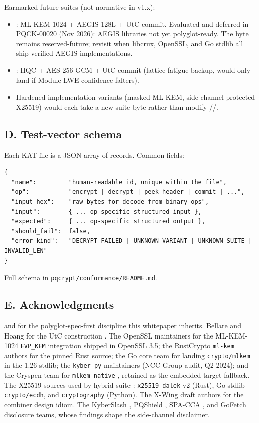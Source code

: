 Earmarked future suites (not normative in v1.x):
\begin{itemize}
\item {}: ML-KEM-1024 + AEGIS-128L + UtC commit. Evaluated and deferred in PQCK-00020 (Nov 2026): AEGIS libraries not yet polyglot-ready. The byte remains reserved-future; revisit when libcrux, OpenSSL, and Go stdlib all ship verified AEGIS implementations.
\item {}: HQC + AES-256-GCM + UtC commit (lattice-fatigue backup, would only land if Module-LWE confidence falters).
\item Hardened-implementation variants (masked ML-KEM, side-channel-protected X25519) would each take a new suite byte rather than modify //.
\end{itemize}

\subsection*{D. Test-vector schema}

Each KAT file is a JSON array of records. Common fields:

\begin{lstlisting}[language=Pseudocode]
{
  "name":         "human-readable id, unique within the file",
  "op":           "encrypt | decrypt | peek_header | commit | ...",
  "input_hex":    "raw bytes for decode-from-binary ops",
  "input":        { ... op-specific structured input },
  "expected":     { ... op-specific structured output },
  "should_fail":  false,
  "error_kind":   "DECRYPT_FAILED | UNKNOWN_VARIANT | UNKNOWN_SUITE | INVALID_LEN"
}
\end{lstlisting}

Full schema in \texttt{pqcrypt/conformance/README.md}.

\subsection*{E. Acknowledgments}

\pqid{} and \pqhash{} for the polyglot-spec-first discipline this whitepaper inherits. Bellare and Hoang for the UtC construction \citep{bellare2022commitment}. The OpenSSL maintainers for the ML-KEM-1024 \texttt{EVP\_KEM} integration shipped in OpenSSL 3.5; the RustCrypto \texttt{ml-kem} authors for the pinned Rust source; the Go core team for landing \texttt{crypto/mlkem} in the 1.26 stdlib; the \texttt{kyber-py} maintainers (NCC Group audit, Q2 2024); and the Cryspen team for \texttt{mlkem-native} \citep{cryspen2025mlkem}, retained as the embedded-target fallback. The X25519 sources used by hybrid suite : \texttt{x25519-dalek} v2 (Rust), Go stdlib \texttt{crypto/ecdh}, and \texttt{cryptography} (Python). The X-Wing draft authors \citep{xwing-draft} for the combiner design idiom. The KyberSlash \citep{kyberslash}, PQShield \citep{pqshield2024}, SPA-CCA \citep{guo2024spa}, and GoFetch \citep{gofetch} disclosure teams, whose findings shape the side-channel disclaimer.

